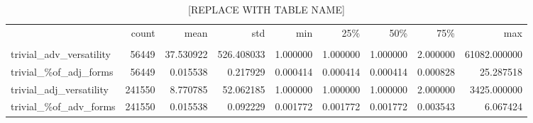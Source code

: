 
\begin{table}[ht]
\caption{[REPLACE WITH TABLE NAME]}
\label{trivial-vers-adv}
\begin{tabular}{lrrrrrrrr}
\toprule
 & count & mean & std & min & 25\% & 50\% & 75\% & max \\
 &  &  &  &  &  &  &  &  \\
\midrule
trivial\_adv\_versatility & 56449 & 37.530922 & 526.408033 & 1.000000 & 1.000000 & 1.000000 & 2.000000 & 61082.000000 \\
trivial\_\%of\_adj\_forms & 56449 & 0.015538 & 0.217929 & 0.000414 & 0.000414 & 0.000414 & 0.000828 & 25.287518 \\
trivial\_adj\_versatility & 241550 & 8.770785 & 52.062185 & 1.000000 & 1.000000 & 1.000000 & 2.000000 & 3425.000000 \\
trivial\_\%of\_adv\_forms & 241550 & 0.015538 & 0.092229 & 0.001772 & 0.001772 & 0.001772 & 0.003543 & 6.067424 \\
\bottomrule
\end{tabular}
\end{table}
